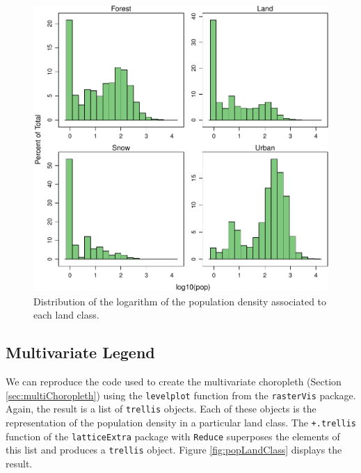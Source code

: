 \documentclass[smallroyalvopaper]{memoir}
\begin{document}
\begin{figure}[htb]
\centering
\includegraphics[width=.9\linewidth]{figs/histogramLandClass.pdf}
\caption{\label{fig:histogramLandClass}Distribution of the logarithm of the population density associated to each land class.}
\end{figure}

\subsection{\floweroneleft  Multivariate Legend}
\label{sec-1-3}
We can reproduce the code used to create the multivariate
choropleth (Section \ref{sec:multiChoropleth}) using the
\texttt{levelplot} function from the \texttt{rasterVis} package. Again, the
result is a list of \texttt{trellis} objects. Each of these objects is
the representation of the population density in a particular land
class. The \texttt{+.trellis} function of the \texttt{latticeExtra} package with
\texttt{Reduce} superposes the elements of this list and produces a
\texttt{trellis} object. Figure \ref{fig:popLandClass} displays the
result.
\end{document}
